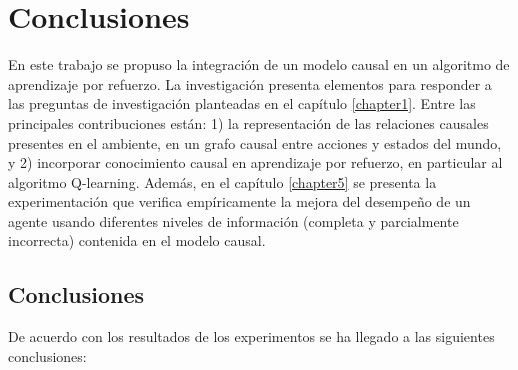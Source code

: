 \chapter{Conclusiones}\label{chapter6}

\graphicspath{{Chapter5/Figs/}}


En este trabajo se propuso la integración de un modelo causal en un
algoritmo de aprendizaje por refuerzo.
La investigación presenta
elementos para responder a las preguntas de investigación planteadas en el capítulo \ref{chapter1}. Entre las principales contribuciones están: 1) la representación de las relaciones causales presentes en el ambiente, en un grafo causal entre acciones y estados del mundo, y 2) incorporar conocimiento causal en aprendizaje por refuerzo, en particular al
algoritmo Q-learning.
Además, en el capítulo \ref{chapter5} se presenta la experimentación que verifica empíricamente
    la mejora del desempeño de un agente usando diferentes niveles de información (completa y parcialmente incorrecta) contenida en el modelo causal. 

\section{Conclusiones}
    De acuerdo con los resultados de los experimentos 
    se ha llegado a las siguientes conclusiones:
    
